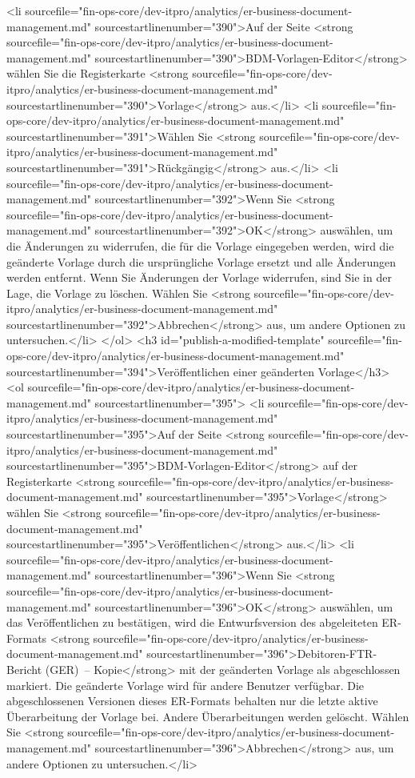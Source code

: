 <li sourcefile="fin-ops-core/dev-itpro/analytics/er-business-document-management.md" sourcestartlinenumber="390">Auf der Seite <strong sourcefile="fin-ops-core/dev-itpro/analytics/er-business-document-management.md" sourcestartlinenumber="390">BDM-Vorlagen-Editor</strong> wählen Sie die Registerkarte <strong sourcefile="fin-ops-core/dev-itpro/analytics/er-business-document-management.md" sourcestartlinenumber="390">Vorlage</strong> aus.</li>
<li sourcefile="fin-ops-core/dev-itpro/analytics/er-business-document-management.md" sourcestartlinenumber="391">Wählen Sie <strong sourcefile="fin-ops-core/dev-itpro/analytics/er-business-document-management.md" sourcestartlinenumber="391">Rückgängig</strong> aus.</li>
<li sourcefile="fin-ops-core/dev-itpro/analytics/er-business-document-management.md" sourcestartlinenumber="392">Wenn Sie <strong sourcefile="fin-ops-core/dev-itpro/analytics/er-business-document-management.md" sourcestartlinenumber="392">OK</strong> auswählen, um die Änderungen zu widerrufen, die für die Vorlage eingegeben werden, wird die geänderte Vorlage durch die ursprüngliche Vorlage ersetzt und alle Änderungen werden entfernt. Wenn Sie Änderungen der Vorlage widerrufen, sind Sie in der Lage, die Vorlage zu löschen. Wählen Sie <strong sourcefile="fin-ops-core/dev-itpro/analytics/er-business-document-management.md" sourcestartlinenumber="392">Abbrechen</strong> aus, um andere Optionen zu untersuchen.</li>
</ol>
<h3 id="publish-a-modified-template" sourcefile="fin-ops-core/dev-itpro/analytics/er-business-document-management.md" sourcestartlinenumber="394">Veröffentlichen einer geänderten Vorlage</h3>
<ol sourcefile="fin-ops-core/dev-itpro/analytics/er-business-document-management.md" sourcestartlinenumber="395">
<li sourcefile="fin-ops-core/dev-itpro/analytics/er-business-document-management.md" sourcestartlinenumber="395">Auf der Seite <strong sourcefile="fin-ops-core/dev-itpro/analytics/er-business-document-management.md" sourcestartlinenumber="395">BDM-Vorlagen-Editor</strong> auf der Registerkarte <strong sourcefile="fin-ops-core/dev-itpro/analytics/er-business-document-management.md" sourcestartlinenumber="395">Vorlage</strong> wählen Sie <strong sourcefile="fin-ops-core/dev-itpro/analytics/er-business-document-management.md" sourcestartlinenumber="395">Veröffentlichen</strong> aus.</li>
<li sourcefile="fin-ops-core/dev-itpro/analytics/er-business-document-management.md" sourcestartlinenumber="396">Wenn Sie <strong sourcefile="fin-ops-core/dev-itpro/analytics/er-business-document-management.md" sourcestartlinenumber="396">OK</strong> auswählen, um das Veröffentlichen zu bestätigen, wird die Entwurfsversion des abgeleiteten ER-Formats <strong sourcefile="fin-ops-core/dev-itpro/analytics/er-business-document-management.md" sourcestartlinenumber="396">Debitoren-FTR-Bericht (GER) – Kopie</strong> mit der geänderten Vorlage als abgeschlossen markiert. Die geänderte Vorlage wird für andere Benutzer verfügbar. Die abgeschlossenen Versionen dieses ER-Formats behalten nur die letzte aktive Überarbeitung der Vorlage bei. Andere Überarbeitungen werden gelöscht. Wählen Sie <strong sourcefile="fin-ops-core/dev-itpro/analytics/er-business-document-management.md" sourcestartlinenumber="396">Abbrechen</strong> aus, um andere Optionen zu untersuchen.</li>
